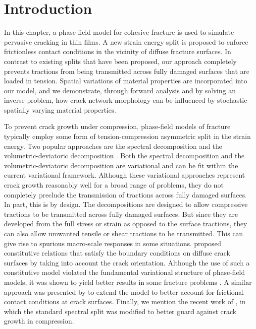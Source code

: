 \section{Introduction}
\label{section: Chapter4/intro}

In this chapter, a phase-field model for cohesive fracture is used to simulate pervasive cracking in thin films. A new strain energy split is proposed to enforce frictionless contact conditions in the vicinity of diffuse fracture surfaces. In contrast to existing splits that have been proposed, our approach completely prevents tractions from being transmitted across fully damaged surfaces that are loaded in tension. Spatial variations of material properties are incorporated into our model, and we demonstrate, through forward analysis and by solving an inverse problem, how crack network morphology can be influenced by stochastic spatially varying material properties.

To prevent crack growth under compression, phase-field models of fracture typically employ some form of tension-compression asymmetric split in the strain energy. Two popular approaches are the spectral decomposition \cite{miehe_2010_p1, miehe_2010_p2} and the volumetric-deviatoric decomposition \cite{AMOR20091209}. Both the spectral decomposition and the volumetric-deviatoric decomposition are variational and can be fit within the current variational framework.
Although these variational approaches represent crack growth reasonably well for a broad range of problems, they do not completely preclude the transmission of tractions across fully damaged surfaces.   In part, this is by design.  The decompositions are designed to allow compressive tractions to be transmitted across fully damaged surfaces.  But since they are developed from the full stress or strain as opposed to the surface tractions, they can also allow umwanted tensile or shear tractions to be transmitted. This can give rise to spurious macro-scale responses in some situations.
\citet{strobl2015novel} proposed constitutive relations that satisfy the boundary conditions on diffuse crack surfaces by taking into account the crack orientation. Although the use of such a constitutive model violated the fundamental variational structure of phase-field models, it was shown to yield better results in some fracture problems \cite{strobl2016constitutive}.  A similar approach was presented by  \citet{fei2019phase, fei2020phasefield} to extend the model to better account for frictional contact conditions at crack surfaces.  Finally, we mention the recent work of \citet{Landis-fatigue}, in which the standard spectral split was modified to better guard against crack growth in compression.

